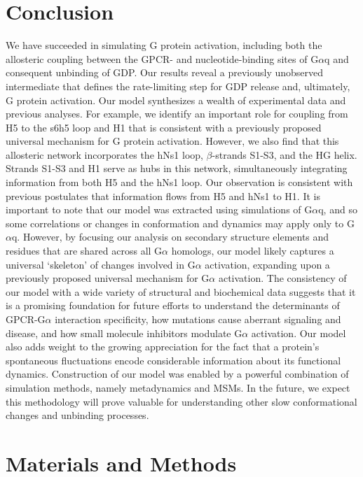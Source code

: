 \documentclass[../main.tex]{subfiles}
\begin{document}
    \section{Conclusion}
        We have succeeded in simulating G protein activation, including both the allosteric coupling between the GPCR- and nucleotide-binding sites of G$\alpha$q and consequent unbinding of GDP. Our results reveal a previously unobserved intermediate that defines the rate-limiting step for GDP release and, ultimately, G protein activation. Our model synthesizes a wealth of experimental data and previous analyses. For example, we identify an important role for coupling from H5 to the s6h5 loop and H1 that is consistent with a previously proposed universal mechanism for G protein activation. However, we also find that this allosteric network incorporates the hNs1 loop, $\beta$-strands S1-S3, and the HG helix. Strands S1-S3 and H1 serve as hubs in this network, simultaneously integrating information from both H5 and the hNs1 loop. Our observation is consistent with previous postulates that information flows from H5 and hNs1 to H1\cite{Preininger:2013if}. It is important to note that our model was extracted using simulations of G$\alpha$q, and so some correlations or changes in conformation and dynamics may apply only to G$\alpha$q. However, by focusing our analysis on secondary structure elements and residues that are shared across all G$\alpha$ homologs, our model likely captures a universal ‘skeleton’ of changes involved in G$\alpha$ activation, expanding upon a previously proposed universal mechanism for G$\alpha$ activation\cite{Flock:2015dj}. The consistency of our model with a wide variety of structural and biochemical data suggests that it is a promising foundation for future efforts to understand the determinants of GPCR-G$\alpha$ interaction specificity, how mutations cause aberrant signaling and disease, and how small molecule inhibitors modulate G$\alpha$ activation. Our model also adds weight to the growing appreciation for the fact that a protein’s spontaneous fluctuations encode considerable information about its functional dynamics\cite{Koehl:2018fv,DraperJoyce:2018il,GarciaNafria:2018hu,Kang:2018kq}. Construction of our model was enabled by a powerful combination of simulation methods, namely metadynamics and MSMs. In the future, we expect this methodology will prove valuable for understanding other slow conformational changes and unbinding processes.


	\section{Materials and Methods}
\end{document}
